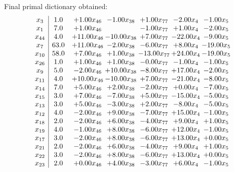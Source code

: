 \documentclass[8pt]{article}
\begin{document}
 Final primal dictionary obtained: 
\[\begin{array}{c| c c@{\hskip 2pt} c@{\hskip 2pt} c@{\hskip 2pt} c@{\hskip 2pt} c@{\hskip 2pt} }
 x_{3}   &  1.0 & +  1.00 x_{46} & -1.00 x_{38} & +  1.00 x_{77} & -2.00 x_{4} & -1.00 x_{5}\\
 x_{1}   &  7.0 & +  1.00 x_{46} &   & -1.00 x_{77} & +  1.00 x_{4} & -2.00 x_{5}\\
 x_{44}   &  4.0 & + 11.00 x_{46} & -10.00 x_{38} & +  7.00 x_{77} & -22.00 x_{4} & -9.00 x_{5}\\
 x_{7}   &  63.0 & + 11.00 x_{46} & -2.00 x_{38} & -6.00 x_{77} & +  8.00 x_{4} & -19.00 x_{5}\\
 x_{10}   &  58.0 & +  7.00 x_{46} & +  1.00 x_{38} & -13.00 x_{77} & + 24.00 x_{4} & -19.00 x_{5}\\
 x_{26}   &  1.0 & +  1.00 x_{46} & +  1.00 x_{38} & -0.00 x_{77} & -1.00 x_{4} & -1.00 x_{5}\\
 x_{9}   &  5.0 & -2.00 x_{46} & + 10.00 x_{38} & -8.00 x_{77} & + 17.00 x_{4} & -2.00 x_{5}\\
 x_{11}   &  4.0 & + 10.00 x_{46} & -10.00 x_{38} & +  7.00 x_{77} & -21.00 x_{4} & -8.00 x_{5}\\
 x_{14}   &  7.0 & +  5.00 x_{46} & +  2.00 x_{38} & -2.00 x_{77} & +  0.00 x_{4} & -7.00 x_{5}\\
 x_{15}   &  3.0 & +  7.00 x_{46} & -7.00 x_{38} & +  5.00 x_{77} & -15.00 x_{4} & -5.00 x_{5}\\
 x_{13}   &  3.0 & +  5.00 x_{46} & -3.00 x_{38} & +  2.00 x_{77} & -8.00 x_{4} & -5.00 x_{5}\\
 x_{12}   &  4.0 & -2.00 x_{46} & +  9.00 x_{38} & -7.00 x_{77} & + 15.00 x_{4} & -1.00 x_{5}\\
 x_{18}   &  2.0 & -2.00 x_{46} & +  6.00 x_{38} & -4.00 x_{77} & +  9.00 x_{4} & +  1.00 x_{5}\\
 x_{19}   &  4.0 & -1.00 x_{46} & +  8.00 x_{38} & -6.00 x_{77} & + 12.00 x_{4} & -1.00 x_{5}\\
 x_{17}   &  3.0 & -2.00 x_{46} & +  8.00 x_{38} & -6.00 x_{77} & + 13.00 x_{4} & +  0.00 x_{5}\\
 x_{21}   &  2.0 & -2.00 x_{46} & +  6.00 x_{38} & -4.00 x_{77} & +  9.00 x_{4} & +  1.00 x_{5}\\
 x_{22}   &  3.0 & -2.00 x_{46} & +  8.00 x_{38} & -6.00 x_{77} & + 13.00 x_{4} & +  0.00 x_{5}\\
 x_{23}   &  2.0 & +  0.00 x_{46} & +  4.00 x_{38} & -3.00 x_{77} & +  6.00 x_{4} & -1.00 x_{5}\\

\end{array}\]
\end{document}
